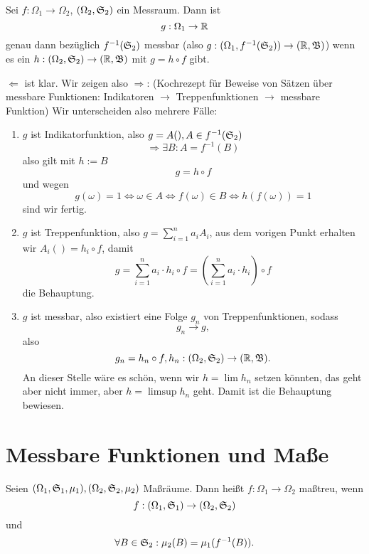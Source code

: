 			\begin{satz}
				Sei $f:\Omega_1\to\Omega_2$, $(\Omega_2,\mathfrak{S}_2)$ ein Messraum. Dann ist
				\[ g:\Omega_1\to \mathbb{R} \]
				genau dann bezüglich $f^{-1}(\mathfrak{S}_2)$ messbar (also $g:(\Omega_1,f^{-1}(\mathfrak{S}_2))\to(\mathbb{R},\mathfrak{B})$) wenn es ein $h:(\Omega_2,\mathfrak{S}_2)\to(\mathbb{R}, \mathfrak{B})$ mit $g=h\circ f$ gibt. 
			\end{satz}
			
			\begin{bew}
				$\Leftarrow$ ist klar.\newline
				Wir zeigen also $\Rightarrow$: (Kochrezept für Beweise von Sätzen über messbare Funktionen: Indikatoren $\rightarrow$ Treppenfunktionen $\rightarrow$ messbare Funktion)\newline
				Wir unterscheiden also mehrere Fälle:
				\begin{enumerate}[(1)]
					\item $g$ ist Indikatorfunktion, also $g=A(), A\in f^{-1}(\mathfrak{S}_2)$
					\[ \Rightarrow \exists B: A=f^{-1}(B) \]
					also gilt mit $h:=B$
					\[ g=h\circ f \]
					und wegen
					\[ g(\omega)=1\Leftrightarrow \omega\in A\Leftrightarrow f(\omega)\in B\Leftrightarrow h(f(\omega))=1 \]
					sind wir fertig.
					\item $g$ ist Treppenfunktion, also $g=\sum_{i=1}^n a_i A_i$, aus dem vorigen Punkt erhalten wir $A_i()=h_i\circ f$, damit
					\[ g=\sum_{i=1}^{n}a_i\cdot h_i\circ f=\left(\sum_{i=1}^{n}a_i\cdot h_i\right)\circ f \]
					die Behauptung.
					\item $g$ ist messbar, also existiert eine Folge $g_n$ von Treppenfunktionen, sodass
					\[ g_n\to g, \]
					also 
					\[ g_n=h_n\circ f, h_n:(\Omega_2, \mathfrak{S}_2)\to(\mathbb{R},\mathfrak{B}). \]
					An dieser Stelle wäre es schön, wenn wir $h=\lim h_n$ setzen könnten, das geht aber nicht immer, aber $h=\limsup h_n$ geht. Damit ist die Behauptung bewiesen. 
				\end{enumerate}
			\end{bew}
			
		\section{Messbare Funktionen und Maße}
			\begin{defi}
				Seien $(\Omega_1,\mathfrak{S}_1,\mu_1),(\Omega_2,\mathfrak{S}_2,\mu_2)$ Maßräume. Dann heißt $f:\Omega_1\to \Omega_2$ maßtreu, wenn
				\[ f: (\Omega_1,\mathfrak{S}_1)\to (\Omega_2, \mathfrak{S}_2) \]
				und
				\[ \forall B\in\mathfrak{S}_2: \mu_2(B)=\mu_1(f^{-1}(B)). \]
			\end{defi}
			
